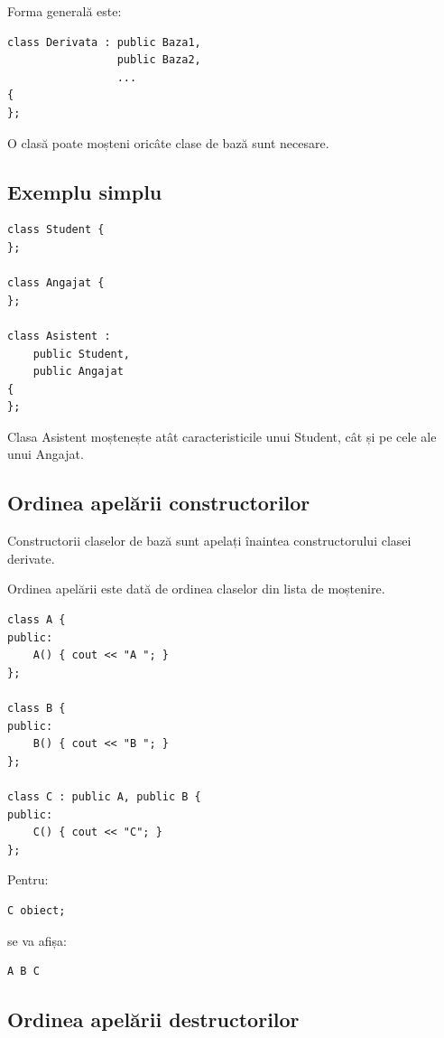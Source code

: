 \documentclass[12pt,a4paper]{article}
\begin{document}
Forma generală este:

\begin{verbatim}
class Derivata : public Baza1,
                 public Baza2,
                 ...
{
};
\end{verbatim}

O clasă poate moșteni oricâte clase de bază sunt necesare.

\subsection{Exemplu simplu}

\begin{verbatim}
class Student {
};

class Angajat {
};

class Asistent :
    public Student,
    public Angajat
{
};
\end{verbatim}

Clasa Asistent moștenește atât caracteristicile unui Student, cât și pe cele ale unui Angajat.

\subsection{Ordinea apelării constructorilor}

Constructorii claselor de bază sunt apelați înaintea constructorului clasei derivate.

Ordinea apelării este dată de ordinea claselor din lista de moștenire.

\begin{verbatim}
class A {
public:
    A() { cout << "A "; }
};

class B {
public:
    B() { cout << "B "; }
};

class C : public A, public B {
public:
    C() { cout << "C"; }
};
\end{verbatim}

Pentru:

\begin{verbatim}
C obiect;
\end{verbatim}

se va afișa:

\begin{verbatim}
A B C
\end{verbatim}

\subsection{Ordinea apelării destructorilor}
\end{document}
